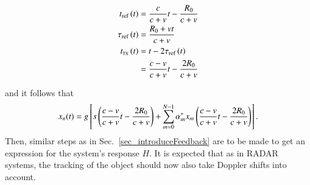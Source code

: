 \begin{equation}
    \label{eq_fut_constV_ti}
    \begin{split}
        t_{\text{ref}}\left({t}\right) &= \frac{c}{c+v}t-\frac{R_{0}}{c+v} \\
        \tau_{\text{ref}}\left({t}\right) &= \frac{R_{0}+vt}{c+v} \\
        t_{\text{\tiny{TX}}}\left({t}\right) &= t-2\tau_{\text{ref}}\left({t}\right) \\ 
        &= \frac{c-v}{c+v}t-\frac{2R_{0}}{c+v} \\
    \end{split}
\end{equation}

and it follows that
\begin{equation}
    \label{eq_fut_constV_xn}
    x_{n}(t) = g\left[{s\left({\frac{c-v}{c+v}t-\frac{2R_{0}}{c+v}}\right)
    +\sum_{m=0}^{N-1}{\alpha^{*}_{m}x_{m}\left({\frac{c-v}{c+v}t-\frac{2R_{0}}{c+v}}\right)}}\right].
\end{equation}
Then, similar steps as in Sec.~\ref{sec_introduceFeedback} are to be made to get an expression for the system's response $H$.
It is expected that as in RADAR systems, the tracking of the object should now also take Doppler shifts into account.
